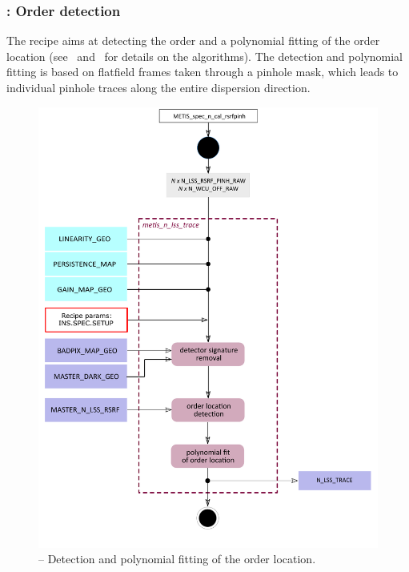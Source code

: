 \subsubsection{:  Order detection}\label{rec:metis_n_lss_trace}
The recipe  aims at detecting the order and a polynomial fitting of the order location (see~\cite{pis02} and~\cite{pis21} for details on the algorithms). The detection and polynomial fitting is based on flatfield frames taken through a pinhole mask, which leads to individual pinhole traces along the entire dispersion direction.

\begin{figure}[ht]
  \centering
  \includegraphics[width=0.5\textheight]{figures/metis_n_lss_trace_v0.84.pdf}
  \caption[Recipe: ]{ --
    Detection and polynomial fitting of the order location.}
  \label{Fig:rec_n_lss_wave}
\end{figure}

